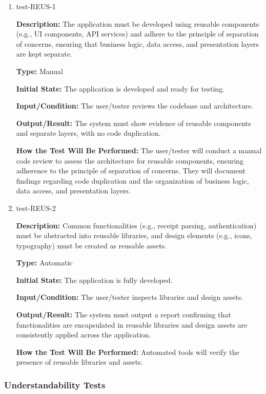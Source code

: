 \documentclass[12pt, titlepage]{article}
\begin{document}
\begin{enumerate}

\item{test-REUS-1\\}

\textbf{Description:} The application must be developed using reusable components (e.g., UI components, API services) and adhere to the principle of separation of concerns, ensuring that business logic, data access, and presentation layers are kept separate.

\textbf{Type:} Manual
					
\textbf{Initial State:} The application is developed and ready for testing.
					
\textbf{Input/Condition:} The user/tester reviews the codebase and architecture.
					
\textbf{Output/Result:} The system must show evidence of reusable components and separate layers, with no code duplication.
					
\textbf{How the Test Will Be Performed:} The user/tester will conduct a manual code review to assess the architecture for reusable components, ensuring adherence to the principle of separation of concerns. They will document findings regarding code duplication and the organization of business logic, data access, and presentation layers.

\item{test-REUS-2\\}

\textbf{Description:} Common functionalities (e.g., receipt parsing, authentication) must be abstracted into reusable libraries, and design elements (e.g., icons, typography) must be created as reusable assets.

\textbf{Type:} Automatic
					
\textbf{Initial State:} The application is fully developed.
					
\textbf{Input/Condition:} The user/tester inspects libraries and design assets.
					
\textbf{Output/Result:} The system must output a report confirming that functionalities are encapsulated in reusable libraries and design assets are consistently applied across the application.
					
\textbf{How the Test Will Be Performed:} Automated tools will verify the presence of reusable libraries and assets.

\end{enumerate}

\subsubsection{Understandability Tests}
\end{document}
